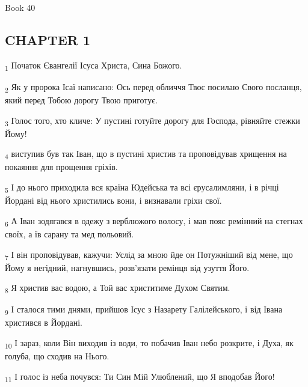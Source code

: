 Book 40
\subsection{CHAPTER 1}
\begin{tcolorbox}
\textsubscript{1} Початок Євангелії Ісуса Христа, Сина Божого.
\end{tcolorbox}
\begin{tcolorbox}
\textsubscript{2} Як у пророка Ісаї написано: Ось перед обличчя Твоє посилаю Свого посланця, який перед Тобою дорогу Твою приготує.
\end{tcolorbox}
\begin{tcolorbox}
\textsubscript{3} Голос того, хто кличе: У пустині готуйте дорогу для Господа, рівняйте стежки Йому!
\end{tcolorbox}
\begin{tcolorbox}
\textsubscript{4} виступив був так Іван, що в пустині христив та проповідував хрищення на покаяння для прощення гріхів.
\end{tcolorbox}
\begin{tcolorbox}
\textsubscript{5} І до нього приходила вся країна Юдейська та всі єрусалимляни, і в річці Йордані від нього христились вони, і визнавали гріхи свої.
\end{tcolorbox}
\begin{tcolorbox}
\textsubscript{6} А Іван зодягався в одежу з верблюжого волосу, і мав пояс ремінний на стегнах своїх, а їв сарану та мед польовий.
\end{tcolorbox}
\begin{tcolorbox}
\textsubscript{7} І він проповідував, кажучи: Услід за мною йде он Потужніший від мене, що Йому я негідний, нагнувшись, розв'язати ремінця від узуття Його.
\end{tcolorbox}
\begin{tcolorbox}
\textsubscript{8} Я христив вас водою, а Той вас христитиме Духом Святим.
\end{tcolorbox}
\begin{tcolorbox}
\textsubscript{9} І сталося тими днями, прийшов Ісус з Назарету Галілейського, і від Івана христився в Йордані.
\end{tcolorbox}
\begin{tcolorbox}
\textsubscript{10} І зараз, коли Він виходив із води, то побачив Іван небо розкрите, і Духа, як голуба, що сходив на Нього.
\end{tcolorbox}
\begin{tcolorbox}
\textsubscript{11} І голос із неба почувся: Ти Син Мій Улюблений, що Я вподобав Його!
\end{tcolorbox}
